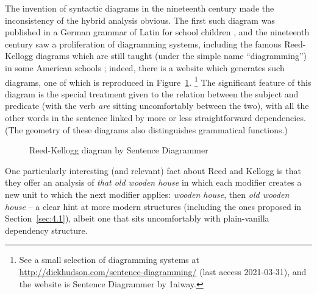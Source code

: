 \documentclass[output=paper
 	        ,biblatex
                ,babelshorthands
                ,newtxmath
                ,draftmode
                ,colorlinks, citecolor=brown
]{langscibook}
\begin{document}
The invention of syntactic diagrams in the nineteenth century made the inconsistency of the hybrid
analysis obvious. The first such diagram was published in a German grammar of Latin for school
children \citep{Billroth1832}, and the nineteenth century saw a proliferation of diagramming
systems, including the famous Reed-Kellogg diagrams which are still taught (under the simple name
``diagramming'') in some American schools \citep{ReedKellog1890}; indeed, there is a website which
generates such diagrams, one of which is reproduced in Figure~\ref{fig:2}.%
%
\footnote{See a small selection of diagramming systems at
  \url{http://dickhudson.com/sentence-diagramming/} (last access 2021-03-31), and the website is
  Sentence Diagrammer by 1aiway.} 
%
The significant feature of this diagram is the special treatment given to the relation between the
subject and predicate (with the verb \emph{are} sitting uncomfortably between the two), with all the
other words in the sentence linked by more or less straightforward dependencies. (The geometry of
these diagrams also distinguishes grammatical functions.) 
 
 \begin{figure}
 	\centering
{}
	\caption{Reed-Kellogg diagram by Sentence Diagrammer}
	\label{fig:2}
 \end{figure}
 
One particularly interesting (and relevant) fact about Reed and Kellogg is that they offer an analysis of \emph{that old wooden house} in which each modifier creates a new unit to which the next modifier applies: \emph{wooden house}, then \emph{old wooden house} \citep[18]{Percival1976} – a clear hint at more modern structures (including the ones proposed in Section~\ref{sec:4.1}), albeit one that sits uncomfortably with plain-vanilla dependency structure.
 
\end{document}
